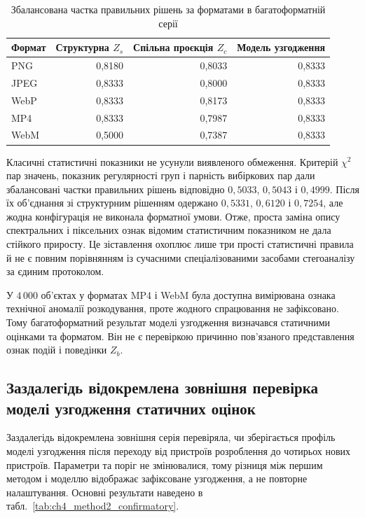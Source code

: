 \begin{table}[htbp]
\caption{Збалансована частка правильних рішень за форматами в багатоформатній серії}
\label{tab:ch4_format_transfer}
\centering
\small
\begin{tabular}{lrrr}
\toprule
Формат & Структурна $Z_s$ & Спільна проєкція $Z_c$ & Модель узгодження \\
\midrule
PNG & 0,8180 & 0,8033 & 0,8333 \\
JPEG & 0,8333 & 0,8000 & 0,8333 \\
WebP & 0,8333 & 0,8173 & 0,8333 \\
MP4 & 0,8333 & 0,7987 & 0,8333 \\
WebM & 0,5000 & 0,7387 & 0,8333 \\
\bottomrule
\end{tabular}
\end{table}

Класичні статистичні показники не усунули виявленого обмеження. Критерій $\chi^2$ пар значень, показник регулярності груп і парність вибіркових пар дали збалансовані частки правильних рішень відповідно $0{,}5033$, $0{,}5043$ і $0{,}4999$. Після їх об’єднання зі структурним рішенням одержано $0{,}5331$, $0{,}6120$ і $0{,}7254$, але жодна конфігурація не виконала форматної умови. Отже, проста заміна опису спектральних і піксельних ознак відомим статистичним показником не дала стійкого приросту. Це зіставлення охоплює лише три прості статистичні правила й не є повним порівнянням із сучасними спеціалізованими засобами стегоаналізу за єдиним протоколом.

У $4\,000$ об’єктах у форматах MP4 і WebM була доступна вимірювана ознака технічної аномалії розкодування, проте жодного спрацювання не зафіксовано. Тому багатоформатний результат моделі узгодження визначався статичними оцінками та форматом. Він не є перевіркою причинно пов’язаного представлення ознак подій і поведінки $Z_b$.

\subsection{Заздалегідь відокремлена зовнішня перевірка моделі узгодження статичних оцінок}

Заздалегідь відокремлена зовнішня серія перевіряла, чи зберігається профіль моделі узгодження після переходу від пристроїв розроблення до чотирьох нових пристроїв. Параметри та поріг не змінювалися, тому різниця між першим методом і моделлю відображає зафіксоване узгодження, а не повторне налаштування. Основні результати наведено в табл.~\ref{tab:ch4_method2_confirmatory}.

